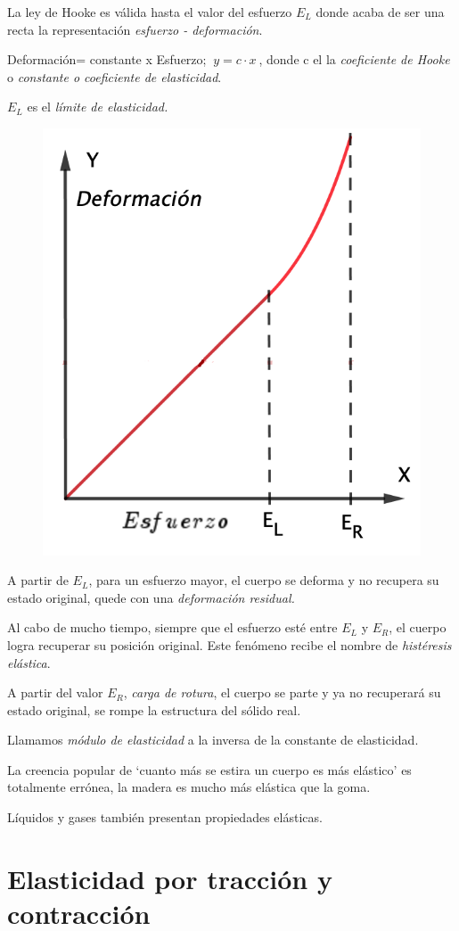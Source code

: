 \vspace{40mm} %
\begin{multicols}{2}

La ley de Hooke es válida hasta el valor del esfuerzo $E_L$ donde acaba de ser una recta la representación \emph{esfuerzo - deformación}.

Deformación= constante x Esfuerzo; $\ y=c\cdot x\ $, donde c el la \emph{coeficiente de Hooke} o \emph{constante o coeficiente de elasticidad}.

$E_L$ es el \emph{límite de elasticidad.}
\begin{figure}[H]
	\centering
	\includegraphics[width=.25\textwidth]{imagenes/imagenes09/T09IM01.png}
\end{figure}
\end{multicols}

A partir de $E_L$, para un esfuerzo mayor, el cuerpo se deforma y no recupera su estado original, quede con una \emph{deformación residual.}

Al cabo de mucho tiempo, siempre que el esfuerzo esté entre $E_L$ y $E_R$, el cuerpo logra recuperar su posición original. Este fenómeno recibe el nombre de \emph{histéresis elástica}.

A partir del valor $E_R$, \emph{carga de rotura}, el cuerpo se parte y ya no recuperará su estado original, se rompe la estructura del sólido real.

Llamamos \emph{módulo de elasticidad} a la inversa de la constante de elasticidad.

La creencia popular de `cuanto más se estira un cuerpo es más elástico' es totalmente errónea, la madera es mucho más elástica que la goma.

Líquidos y gases también presentan propiedades elásticas.

\section{Elasticidad por tracción y contracción}

